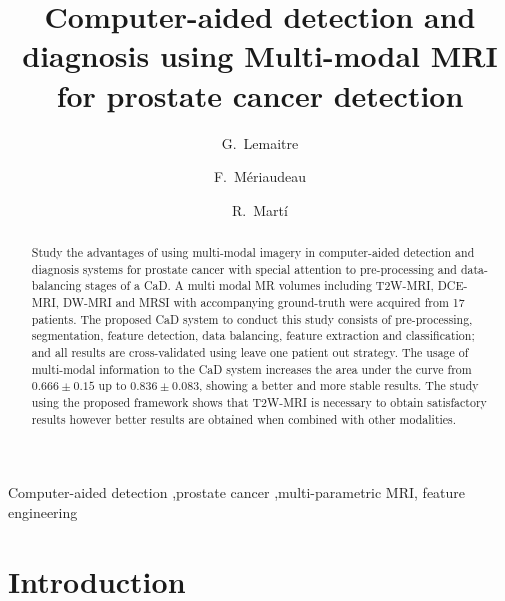 \documentclass[final,3p,times,twocolumn]{elsarticle}
\begin{document}
\begin{frontmatter}


  \title{Computer-aided detection and diagnosis using Multi-modal MRI for
    prostate cancer detection}

  \author[label1]{G.~Lemaitre}
  \author[label2]{F.~M\'eriaudeau}
  \author[label3]{R.~Mart\'i}

  \address[label1]{Parietal team, Inria, CEA, Universit\'e Paris-Saclay, 1 Rue
    Honor\'e d’Estienne d’Orves, 91120 Palaiseau}
  \address[label2]{LE2I UMR6306, CNRS, Arts et M\'etiers, Univ. Bourgogne
    Franche-Comt\'e, 12 rue de la Fonderie, 71200 Le Creusot}
  \address[label3]{ViCOROB, Universitat de Girona, Campus Montilivi, Edifici P4,
    17071 Girona}

  \begin{abstract}
    Study the advantages of using multi-modal imagery in computer-aided
    detection and diagnosis systems for prostate cancer with special attention to
    pre-processing and data-balancing stages of a CaD.  A multi modal MR volumes
    including T2W-MRI, DCE-MRI, DW-MRI and MRSI with accompanying ground-truth were
    acquired from 17 patients. The proposed CaD system to conduct this study
    consists of pre-processing, segmentation, feature detection, data balancing,
    feature extraction and classification; and all results are cross-validated
    using leave one patient out strategy.  The usage of multi-modal information to
    the CaD system increases the area under the curve from $0.666\pm0.15$ up to
    $0.836\pm0.083$, showing a better and more stable results.  The study using the
    proposed framework shows that T2W-MRI is necessary to obtain satisfactory
    results however better results are obtained when combined with other
    modalities.
  \end{abstract}

  \begin{keyword}
    Computer-aided detection \sep prostate cancer \sep multi-parametric MRI\sep
    feature engineering
  \end{keyword}


\end{frontmatter}



\section{Introduction}
\end{document}
